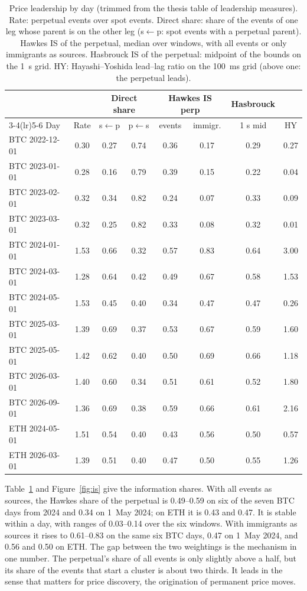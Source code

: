 \documentclass[a4paper,11pt]{article}
\begin{document}
\begin{table}[htbp]
\centering
\caption{Price leadership by day (trimmed from the thesis table of leadership measures). Rate: perpetual events over spot events. Direct share: share of the events of one leg whose parent is on the other leg (s$\leftarrow$p: spot events with a perpetual parent). Hawkes IS of the perpetual, median over windows, with all events or only immigrants as sources. Hasbrouck IS of the perpetual: midpoint of the bounds on the 1~s grid. HY: Hayashi--Yoshida lead--lag ratio on the 100~ms grid (above one: the perpetual leads).}
\label{tab:is}
\small
\begin{tabular}{@{}lccccccc@{}}
\toprule
 & & \multicolumn{2}{c}{Direct share} & \multicolumn{2}{c}{Hawkes IS perp} & Hasbrouck & \\
\cmidrule(lr){3-4}\cmidrule(lr){5-6}
Day & Rate & s$\leftarrow$p & p$\leftarrow$s & events & immigr. & 1 s mid & HY \\
\midrule
BTC 2022-12-01 & 0.30 & 0.27 & 0.74 & 0.36 & 0.17 & 0.29 & 0.27 \\
BTC 2023-01-01 & 0.28 & 0.16 & 0.79 & 0.39 & 0.15 & 0.22 & 0.04 \\
BTC 2023-02-01 & 0.32 & 0.34 & 0.82 & 0.24 & 0.07 & 0.33 & 0.09 \\
BTC 2023-03-01 & 0.32 & 0.25 & 0.82 & 0.33 & 0.08 & 0.32 & 0.01 \\
\midrule
BTC 2024-01-01 & 1.53 & 0.66 & 0.32 & 0.57 & 0.83 & 0.64 & 3.00 \\
BTC 2024-03-01 & 1.28 & 0.64 & 0.42 & 0.49 & 0.67 & 0.58 & 1.53 \\
BTC 2024-05-01 & 1.53 & 0.45 & 0.40 & 0.34 & 0.47 & 0.47 & 0.26 \\
BTC 2025-03-01 & 1.39 & 0.69 & 0.37 & 0.53 & 0.67 & 0.59 & 1.60 \\
BTC 2025-05-01 & 1.42 & 0.62 & 0.40 & 0.50 & 0.69 & 0.66 & 1.18 \\
BTC 2026-03-01 & 1.40 & 0.60 & 0.34 & 0.51 & 0.61 & 0.52 & 1.80 \\
BTC 2026-09-01 & 1.36 & 0.69 & 0.38 & 0.59 & 0.66 & 0.61 & 2.16 \\
\midrule
ETH 2024-05-01 & 1.51 & 0.54 & 0.40 & 0.43 & 0.56 & 0.50 & 0.57 \\
ETH 2026-03-01 & 1.39 & 0.51 & 0.40 & 0.47 & 0.50 & 0.55 & 1.26 \\
\bottomrule
\end{tabular}
\end{table}

Table~\ref{tab:is} and Figure~\ref{fig:is} give the information shares. With all events as sources, the Hawkes share of the perpetual is 0.49--0.59 on six of the seven BTC days from 2024 and 0.34 on 1~May 2024; on ETH it is 0.43 and 0.47. It is stable within a day, with ranges of 0.03--0.14 over the six windows. With immigrants as sources it rises to 0.61--0.83 on the same six BTC days, 0.47 on 1~May 2024, and 0.56 and 0.50 on ETH. The gap between the two weightings is the mechanism in one number. The perpetual's share of all events is only slightly above a half, but its share of the events that start a cluster is about two thirds. It leads in the sense that matters for price discovery, the origination of permanent price moves.
\end{document}
